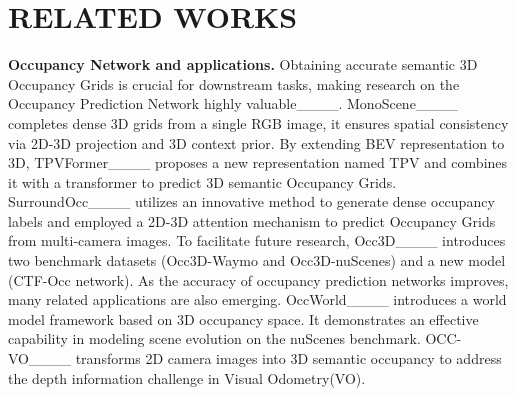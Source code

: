 \section{RELATED WORKS}
\noindent\textbf{Occupancy Network and applications. }Obtaining accurate semantic 3D Occupancy Grids is crucial for downstream tasks, making research on the Occupancy Prediction Network highly valuable____. MonoScene____ completes dense 3D grids from a single RGB image, it ensures spatial consistency via 2D-3D projection and 3D context prior. By extending BEV representation to 3D, TPVFormer____ proposes a new representation named TPV and combines it with a transformer to predict 3D semantic Occupancy Grids. SurroundOcc____ utilizes an innovative method to generate dense occupancy labels and employed a 2D-3D attention mechanism to predict Occupancy Grids from multi-camera images. To facilitate future research, Occ3D____ introduces two benchmark datasets (Occ3D-Waymo and Occ3D-nuScenes) and a new model (CTF-Occ network). As the accuracy of occupancy prediction networks improves, many related applications are also emerging. OccWorld____ introduces a world model framework based on 3D occupancy space. It demonstrates an effective capability in modeling scene evolution on the nuScenes benchmark. OCC-VO____ transforms 2D camera images into 3D semantic occupancy to address the depth information challenge in Visual Odometry(VO). 

